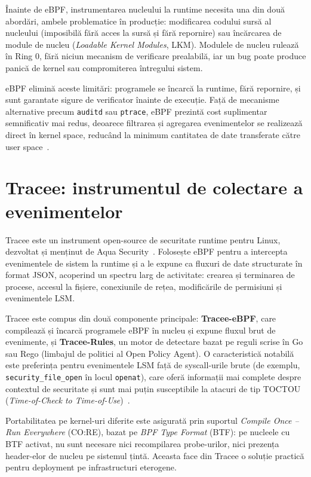 Înainte de eBPF, instrumentarea nucleului la runtime necesita una din două abordări, ambele
problematice în producție: modificarea codului sursă al nucleului (imposibilă fără acces la sursă
și fără repornire) sau încărcarea de module de nucleu (\textit{Loadable Kernel Modules}, LKM).
Modulele de nucleu rulează în Ring 0, fără niciun mecanism de verificare prealabilă, iar un bug
poate produce panică de kernel sau compromiterea întregului sistem.

eBPF elimină aceste limitări: programele se încarcă la runtime, fără repornire, și sunt garantate
sigure de verificator înainte de execuție. Față de mecanisme alternative precum \texttt{auditd}
sau \texttt{ptrace}, eBPF prezintă cost suplimentar semnificativ mai redus, deoarece filtrarea și
agregarea evenimentelor se realizează direct în kernel space, reducând la minimum cantitatea de
date transferate către user space~\cite{gregg2019bpf}.

\section{Tracee: instrumentul de colectare a evenimentelor}

Tracee este un instrument open-source de securitate runtime pentru Linux, dezvoltat și menținut
de Aqua Security~\cite{aqua2024tracee}. Folosește eBPF pentru a intercepta evenimentele de sistem
la runtime și a le expune ca fluxuri de date structurate în format JSON, acoperind un spectru larg
de activitate: crearea și terminarea de procese, accesul la fișiere, conexiunile de rețea,
modificările de permisiuni și evenimentele LSM.

Tracee este compus din două componente principale: \textbf{Tracee-eBPF}, care compilează și
încarcă programele eBPF în nucleu și expune fluxul brut de evenimente, și \textbf{Tracee-Rules},
un motor de detectare bazat pe reguli scrise în Go sau Rego (limbajul de politici al Open Policy
Agent). O caracteristică notabilă este preferința pentru evenimentele
LSM față de syscall-urile brute (de exemplu, \texttt{security\_file\_open} în locul \texttt{openat}),
care oferă informații mai complete despre contextul de securitate și sunt mai puțin susceptibile
la atacuri de tip TOCTOU (\textit{Time-of-Check to Time-of-Use})~\cite{aqua2024tracee}.

Portabilitatea pe kernel-uri diferite este asigurată prin suportul \textit{Compile Once – Run
Everywhere} (CO:RE), bazat pe \textit{BPF Type Format} (BTF): pe nucleele cu BTF activat, nu
sunt necesare nici recompilarea probe-urilor, nici prezența header-elor de nucleu pe sistemul
țintă. Aceasta face din Tracee o soluție practică pentru deployment pe
infrastructuri eterogene.

